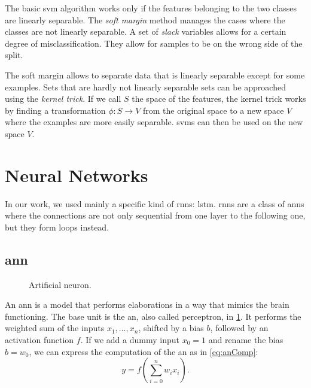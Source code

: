 The basic \ac{svm} algorithm works only if the features belonging to
the two classes are linearly separable. The \emph{soft margin} method
manages the cases where the classes are not linearly separable. A set
of \emph{slack} variables allows for a certain degree of
misclassification. They allow for samples to be on the wrong side of
the split.

The soft margin allows to separate
data that is linearly separable except for some examples. Sets that
are hardly not 
linearly separable sets can be approached using the
\emph{kernel trick}. If we call $S$ the space of the features, the
kernel trick works by finding a transformation $\phi:S\rightarrow V$
from the original space to a new space $V$ where the examples are more
easily separable. \acp{svm} can then be used on the new space $V$.

\section{Neural Networks}
In our work, we used mainly a specific kind of \acp{rnn}: \ac{lstm}.
\acp{rnn} are a class of \acp{ann} where the connections are not only
sequential from one layer to the following one, but they form
loops instead. 

\subsection{\acf{ann}}
\begin{figure}
  \centering
  \caption{Artificial neuron.}
  \label{fig:neuron}
\end{figure}
An \ac{ann} is a model that performs elaborations in a way that
mimics the brain functioning. The base unit is the \ac{an}, also called
perceptron, in
\cref{fig:neuron}. It performs the weighted sum of the inputs
$x_1,\dots,x_n$, shifted by a bias $b$, followed by an activation
function $f$. If we add a dummy input $x_0=1$ and rename the bias
$b=w_0$, we can express the computation of the \ac{an} as in
\cref{eq:anComp}:
\begin{equation}\label{eq:anComp}
  y = f(\sum_{i=0}^n w_i x_i).
\end{equation}

